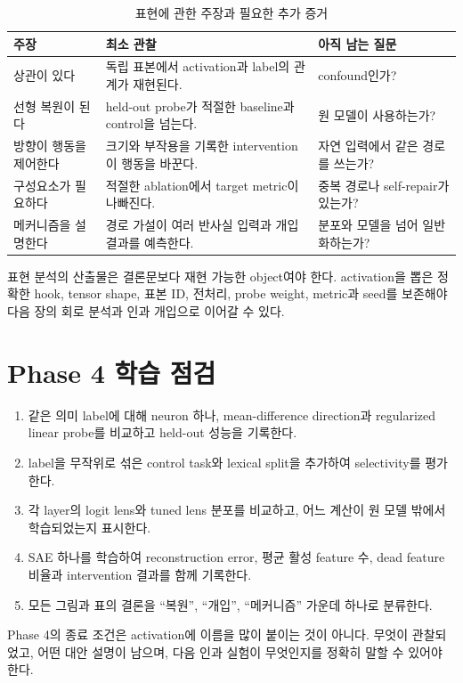 \begin{table}[htbp]
\centering
\caption{표현에 관한 주장과 필요한 추가 증거}
\label{tab:representation-evidence}
\begin{tabularx}{\textwidth}{@{}p{}YY@{}}
\toprule
주장 & 최소 관찰 & 아직 남는 질문 \\
\midrule
상관이 있다 & 독립 표본에서 activation과 label의 관계가 재현된다. & confound인가? \\
선형 복원이 된다 & held-out probe가 적절한 baseline과 control을 넘는다. & 원 모델이 사용하는가? \\
방향이 행동을 제어한다 & 크기와 부작용을 기록한 intervention이 행동을 바꾼다. & 자연 입력에서 같은 경로를 쓰는가? \\
구성요소가 필요하다 & 적절한 ablation에서 target metric이 나빠진다. & 중복 경로나 self-repair가 있는가? \\
메커니즘을 설명한다 & 경로 가설이 여러 반사실 입력과 개입 결과를 예측한다. & 분포와 모델을 넘어 일반화하는가? \\
\bottomrule
\end{tabularx}
\end{table}

표현 분석의 산출물은 결론문보다 재현 가능한 object여야 한다.
activation을 뽑은 정확한 hook, tensor shape, 표본 ID, 전처리, probe weight, metric과 seed를 보존해야 다음 장의 회로 분석과 인과 개입으로 이어갈 수 있다.

\section{Phase 4 학습 점검}

\begin{studybox}
\begin{enumerate}
  \item 같은 의미 label에 대해 neuron 하나, mean-difference direction과 regularized linear probe를 비교하고 held-out 성능을 기록한다.
  \item label을 무작위로 섞은 control task와 lexical split을 추가하여 selectivity를 평가한다.
  \item 각 layer의 logit lens와 tuned lens 분포를 비교하고, 어느 계산이 원 모델 밖에서 학습되었는지 표시한다.
  \item SAE 하나를 학습하여 reconstruction error, 평균 활성 feature 수, dead feature 비율과 intervention 결과를 함께 기록한다.
  \item 모든 그림과 표의 결론을 ``복원'', ``개입'', ``메커니즘'' 가운데 하나로 분류한다.
\end{enumerate}
\end{studybox}

\begin{factbox}
Phase 4의 종료 조건은 activation에 이름을 많이 붙이는 것이 아니다.
무엇이 관찰되었고, 어떤 대안 설명이 남으며, 다음 인과 실험이 무엇인지를 정확히 말할 수 있어야 한다.
\end{factbox}
